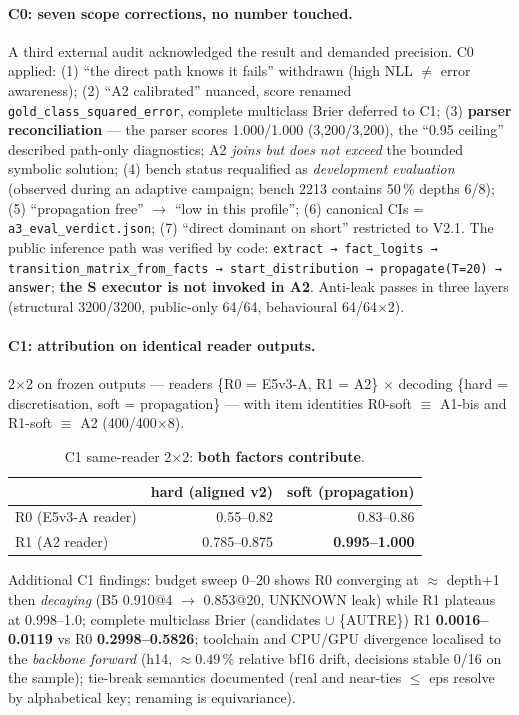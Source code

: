 \documentclass[11pt,a4paper]{article}
\newcommand{\code}[1]{\texttt{#1}}
\begin{document}
\paragraph{C0: seven scope corrections, no number touched.} A third external audit acknowledged the result and demanded precision. C0 applied: (1) ``the direct path knows it fails'' withdrawn (high NLL $\ne$ error awareness); (2) ``A2 calibrated'' nuanced, score renamed \code{gold\_class\_squared\_error}, complete multiclass Brier deferred to C1; (3) \textbf{parser reconciliation} --- the parser scores 1.000/1.000 (3{,}200/3{,}200), the ``0.95 ceiling'' described path-only diagnostics; A2 \emph{joins but does not exceed} the bounded symbolic solution; (4) bench status requalified as \emph{development evaluation} (observed during an adaptive campaign; bench 2213 contains 50\,\% depths 6/8); (5) ``propagation free'' $\to$ ``low in this profile''; (6) canonical CIs = \code{a3\_eval\_verdict.json}; (7) ``direct dominant on short'' restricted to V2.1. The public inference path was verified by code: \code{extract → fact\_logits → transition\_matrix\_from\_facts → start\_distribution → propagate(T=20) → answer}; \textbf{the S executor is not invoked in A2}. Anti-leak passes in three layers (structural 3200/3200, public-only 64/64, behavioural 64/64$\times$2).

\paragraph{C1: attribution on identical reader outputs.} 2$\times$2 on frozen outputs --- readers \{R0 = E5v3-A, R1 = A2\} $\times$ decoding \{hard = discretisation, soft = propagation\} --- with item identities R0-soft $\equiv$ A1-bis and R1-soft $\equiv$ A2 (400/400$\times$8).

\begin{table}[t]
\centering
\caption{C1 same-reader 2$\times$2: \textbf{both factors contribute}.}
\label{tab:c1}
\small
\begin{tabular}{lrr}
\toprule
 & hard (aligned v2) & soft (propagation) \\
\midrule
R0 (E5v3-A reader) & 0.55--0.82 & 0.83--0.86 \\
R1 (A2 reader) & 0.785--0.875 & \textbf{0.995--1.000} \\
\bottomrule
\end{tabular}
\end{table}

Additional C1 findings: budget sweep 0--20 shows R0 converging at $\approx$ depth+1 then \emph{decaying} (B5 0.910@4 $\to$ 0.853@20, UNKNOWN leak) while R1 plateaus at 0.998--1.0; complete multiclass Brier (candidates $\cup$ \{AUTRE\}) R1 \textbf{0.0016--0.0119} vs R0 \textbf{0.2998--0.5826}; toolchain and CPU/GPU divergence localised to the \emph{backbone forward} (h14, $\approx0.49$\,\% relative bf16 drift, decisions stable 0/16 on the sample); tie-break semantics documented (real and near-ties $\le$ eps resolve by alphabetical key; renaming is equivariance).
\end{document}
